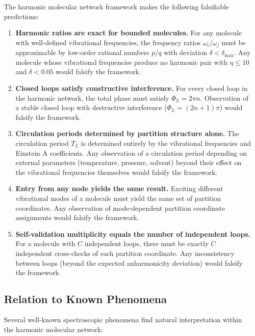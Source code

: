 \documentclass[11pt,a4paper]{article}
\theoremstyle{definition}
\theoremstyle{remark}
\begin{document}
The harmonic molecular network framework makes the following falsifiable predictions:

\begin{enumerate}
\item \textbf{Harmonic ratios are exact for bounded molecules.} For any molecule with well-defined vibrational frequencies, the frequency ratios $\omega_i/\omega_j$ must be approximable by low-order rational numbers $p/q$ with deviation $\delta < \delta_{\max}$. Any molecule whose vibrational frequencies produce no harmonic pair with $\eta \leq 10$ and $\delta < 0.05$ would falsify the framework.

\item \textbf{Closed loops satisfy constructive interference.} For every closed loop in the harmonic network, the total phase must satisfy $\Phi_L = 2\pi n$. Observation of a stable closed loop with destructive interference ($\Phi_L = (2n+1)\pi$) would falsify the framework.

\item \textbf{Circulation periods determined by partition structure alone.} The circulation period $T_L$ is determined entirely by the vibrational frequencies and Einstein A coefficients. Any observation of a circulation period depending on external parameters (temperature, pressure, solvent) beyond their effect on the vibrational frequencies themselves would falsify the framework.

\item \textbf{Entry from any node yields the same result.} Exciting different vibrational modes of a molecule must yield the same set of partition coordinates. Any observation of mode-dependent partition coordinate assignments would falsify the framework.

\item \textbf{Self-validation multiplicity equals the number of independent loops.} For a molecule with $C$ independent loops, there must be exactly $C$ independent cross-checks of each partition coordinate. Any inconsistency between loops (beyond the expected anharmonicity deviation) would falsify the framework.
\end{enumerate}

\subsection{Relation to Known Phenomena}

Several well-known spectroscopic phenomena find natural interpretation within the harmonic molecular network:
\end{document}
